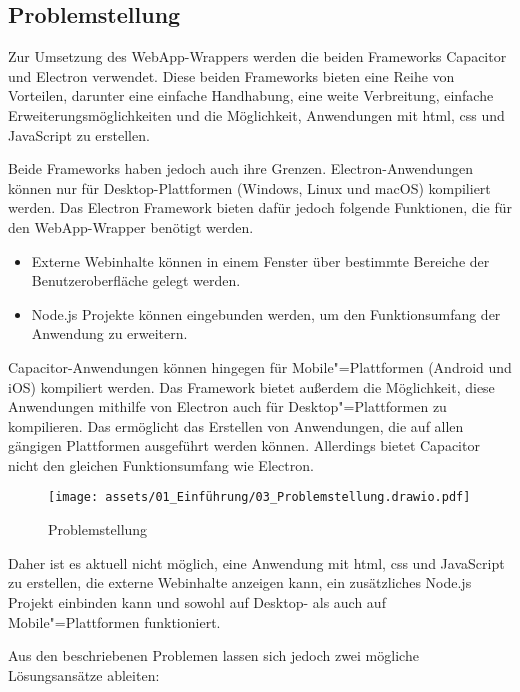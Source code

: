 \subsection{Problemstellung}

Zur Umsetzung des WebApp-Wrappers werden die beiden Frameworks Capacitor und Electron verwendet.
Diese beiden Frameworks bieten eine Reihe von Vorteilen, darunter eine einfache Handhabung, eine weite Verbreitung, einfache Erweiterungsmöglichkeiten und die Möglichkeit, Anwendungen mit \ac{html}, \ac{css} und JavaScript zu erstellen.
\cite{capacitor:docs, electron:docs}

Beide Frameworks haben jedoch auch ihre Grenzen.
Electron-Anwendungen können nur für Desktop-Plattformen (Windows, Linux und macOS) kompiliert werden.
Das Electron Framework bieten dafür jedoch folgende Funktionen, die für den WebApp-Wrapper benötigt werden.
\cite{electron:docs}

\begin{itemize}
    \setlength\itemsep{-0.5em}
    \item Externe Webinhalte können in einem Fenster über bestimmte Bereiche der Benutzeroberfläche gelegt werden.
    \item Node.js Projekte können eingebunden werden, um den Funktionsumfang der Anwendung zu erweitern.
\end{itemize}

Capacitor-Anwendungen können hingegen für Mobile"=Plattformen (Android und iOS) kompiliert werden.
Das Framework bietet außerdem die Möglichkeit, diese Anwendungen mithilfe von Electron auch für Desktop"=Plattformen zu kompilieren.
Das ermöglicht das Erstellen von Anwendungen, die auf allen gängigen Plattformen ausgeführt werden können.
Allerdings bietet Capacitor nicht den gleichen Funktionsumfang wie Electron.
\cite{capacitor:docs, capacitor-electron}

\begin{figure}[H]
    \centering
    \texttt{[image: assets/01\_Einführung/03\_Problemstellung.drawio.pdf]}
    \caption{Problemstellung}
\end{figure}

Daher ist es aktuell nicht möglich, eine Anwendung mit \ac{html}, \ac{css} und JavaScript zu erstellen, die externe Webinhalte anzeigen kann, ein zusätzliches Node.js Projekt einbinden kann und sowohl auf Desktop- als auch auf Mobile"=Plattformen funktioniert.

Aus den beschriebenen Problemen lassen sich jedoch zwei mögliche Lösungsansätze ableiten:

